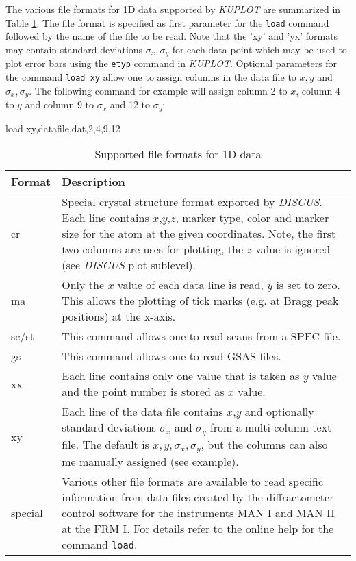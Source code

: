 The various file formats for 1D data supported by {\it KUPLOT} are
summarized in Table \ref{pl1-tab1}. The file format is specified as
first parameter for the {\tt load} command followed by the name of
the file to be read. Note that the 'xy' and 'yx' formats may contain
standard deviations $\sigma_{x}, \sigma_{y}$ for each data point
which may be used to plot error bars using the {\tt etyp} command in
{\it KUPLOT}. Optional parameters for the command {\tt load xy}
allow one to assign columns in the data file to $x, y$ and
$\sigma_{x}, \sigma_{y}$. The following command for example will
assign column 2 to $x$, column 4 to $y$ and column 9 to $\sigma_{x}$
and 12 to $\sigma_{y}$:
%
\begin{MacVerbatim}
    load xy,datafile.dat,2,4,9,12
\end{MacVerbatim}
\par

\begin{table}[!bt]
\centering
\begin{tabularx}{\textwidth}{|p{15mm}|X|}
  \hline
  {\bf Format} & {\bf Description} \\
  \hline\hline
  cr   & Special crystal structure format exported by {\it DISCUS}.
         Each line contains $x$,$y$,$z$, marker type, color and
         marker size for the atom at the given coordinates. Note,
         the first two columns are uses for plotting, the $z$ value
         is ignored (see {\it DISCUS} plot sublevel). \\
  ma   & Only the $x$ value of each data line is read, $y$ is set to
         zero. This allows the plotting of tick marks (e.g. at Bragg peak
         positions) at the x-axis. \\
  sc/st & This command allows one to read scans from a SPEC file.\\
  gs   & This command allows one to read GSAS files.\\
  xx   & Each line contains only one value that is taken as $y$
         value and the point number is stored as $x$ value. \\
  xy   & Each line of the data file contains $x$,$y$ and optionally
         standard deviations $\sigma_{x}$ and $\sigma_{y}$ from a
         multi-column text file. The default is $x,y,\sigma_x,\sigma_y$,
         but the columns can also me manually assigned (see example).\\

  \hline
  special & Various other file formats are available to read specific
            information from data files created by the diffractometer
            control software for the instruments MAN I and MAN II at
            the FRM I.  For details refer to the online help for the
            command {\tt load}.\\
  \hline
\end{tabularx}
\caption{\label{pl1-tab1}Supported file formats for 1D data}
\end{table}

